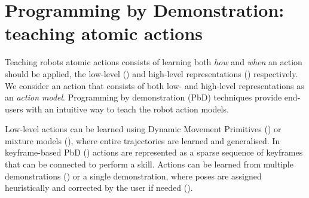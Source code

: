 \section{Programming by Demonstration: teaching atomic actions}
Teaching robots atomic actions consists of learning both \textit{how} and \textit{when} an action should be applied, \ie the low-level () and high-level representations () respectively.
We consider an action that consists of both low- and high-level representations as an \textit{action model}.
Programming by demonstration (PbD) techniques provide end-users with an intuitive way to teach the robot action models. %

Low-level actions can be learned using Dynamic Movement Primitives (\cite{pastor2009learning}) or mixture models (\cite{calinon2007incremental}), where entire trajectories are learned and generalised.
In keyframe-based PbD (\cite{akgun2012keyframe,alexandrova2014robot}) actions are represented as a sparse sequence of keyframes that can be connected to perform a skill.
Actions can be learned from multiple demonstrations (\cite{niekum2012learning}) or a single demonstration, where poses are assigned heuristically and corrected by the user if needed (\cite{alexandrova2014robot}).

